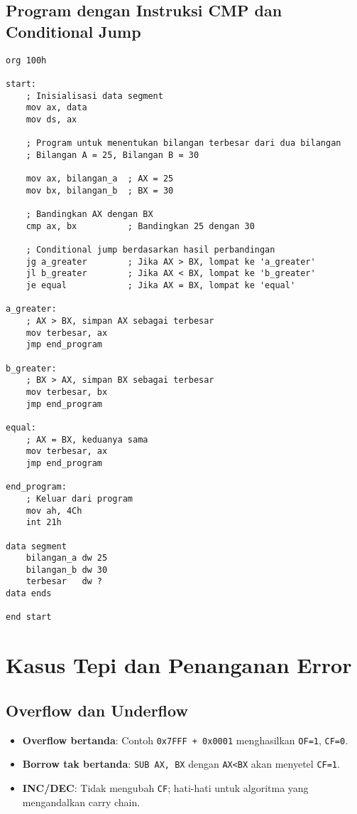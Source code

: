 \documentclass[../main.tex]{subfiles}
\begin{document}
        \subsection{Program dengan Instruksi CMP dan Conditional Jump}
            \begin{lstlisting}[language={[x86masm]Assembler}, caption=Program dengan CMP dan Conditional Jump, label={lst:cmp-program}]
org 100h

start:
    ; Inisialisasi data segment
    mov ax, data
    mov ds, ax
    
    ; Program untuk menentukan bilangan terbesar dari dua bilangan
    ; Bilangan A = 25, Bilangan B = 30
    
    mov ax, bilangan_a  ; AX = 25
    mov bx, bilangan_b  ; BX = 30
    
    ; Bandingkan AX dengan BX
    cmp ax, bx          ; Bandingkan 25 dengan 30
    
    ; Conditional jump berdasarkan hasil perbandingan
    jg a_greater        ; Jika AX > BX, lompat ke 'a_greater'
    jl b_greater        ; Jika AX < BX, lompat ke 'b_greater'
    je equal            ; Jika AX = BX, lompat ke 'equal'
    
a_greater:
    ; AX > BX, simpan AX sebagai terbesar
    mov terbesar, ax
    jmp end_program
    
b_greater:
    ; BX > AX, simpan BX sebagai terbesar
    mov terbesar, bx
    jmp end_program
    
equal:
    ; AX = BX, keduanya sama
    mov terbesar, ax
    jmp end_program
    
end_program:
    ; Keluar dari program
    mov ah, 4Ch
    int 21h

data segment
    bilangan_a dw 25
    bilangan_b dw 30
    terbesar   dw ?
data ends

end start
            \end{lstlisting}

    \section{Kasus Tepi dan Penanganan Error}

        \subsection{Overflow dan Underflow}
            \begin{itemize}
\item \textbf{Overflow bertanda}: Contoh \texttt{0x7FFF + 0x0001} menghasilkan \texttt{OF=1}, \texttt{CF=0}.
\item \textbf{Borrow tak bertanda}: \texttt{SUB AX, BX} dengan \texttt{AX<BX} akan menyetel \texttt{CF=1}.
\item \textbf{INC/DEC}: Tidak mengubah \texttt{CF}; hati-hati untuk algoritma yang mengandalkan carry chain.
            \end{itemize}
\end{document}
